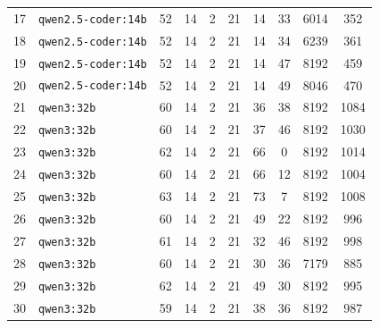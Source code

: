 \begin{table}[htbp]
{\begin{tabular}{|c|l|c|c|c|c|c|c|c|c|}
17 & \texttt{qwen2.5-coder:14b}    & 52 & 14 & 2 & 21 & 14 & 33 &  6014 & 352 \\
18 & \texttt{qwen2.5-coder:14b}    & 52 & 14 & 2 & 21 & 14 & 34 &  6239 & 361 \\
19 & \texttt{qwen2.5-coder:14b}    & 52 & 14 & 2 & 21 & 14 & 47 &  8192 & 459 \\
20 & \texttt{qwen2.5-coder:14b}    & 52 & 14 & 2 & 21 & 14 & 49 &  8046 & 470 \\
\hline
21 & \texttt{qwen3:32b}            & 60 & 14 & 2 & 21 & 36 & 38 &  8192 & 1084 \\
22 & \texttt{qwen3:32b}            & 60 & 14 & 2 & 21 & 37 & 46 &  8192 & 1030 \\
23 & \texttt{qwen3:32b}            & 62 & 14 & 2 & 21 & 66 &  0 &  8192 & 1014 \\
24 & \texttt{qwen3:32b}            & 60 & 14 & 2 & 21 & 66 & 12 &  8192 & 1004 \\
25 & \texttt{qwen3:32b}            & 63 & 14 & 2 & 21 & 73 &  7 &  8192 & 1008 \\
26 & \texttt{qwen3:32b}            & 60 & 14 & 2 & 21 & 49 & 22 &  8192 &  996 \\
27 & \texttt{qwen3:32b}            & 61 & 14 & 2 & 21 & 32 & 46 &  8192 &  998 \\
28 & \texttt{qwen3:32b}            & 60 & 14 & 2 & 21 & 30 & 36 &  7179 &  885 \\
29 & \texttt{qwen3:32b}            & 62 & 14 & 2 & 21 & 49 & 30 &  8192 &  995 \\
30 & \texttt{qwen3:32b}            & 59 & 14 & 2 & 21 & 38 & 36 &  8192 &  987 \\
\hline
\end{tabular}
}%
\label{tab:rohdaten_runs_50}
\end{table}

\clearpage

\label{app:modell_summary_50}

